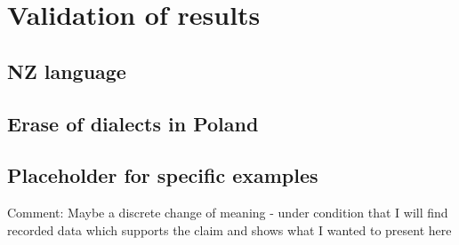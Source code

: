 \section{Validation of results}
\subsection{NZ language}
\subsection{Erase of dialects in Poland}
\subsection{Placeholder for specific examples}
Comment: Maybe a discrete change of meaning - under condition that I will find recorded data which supports the claim and shows what I wanted to present here
